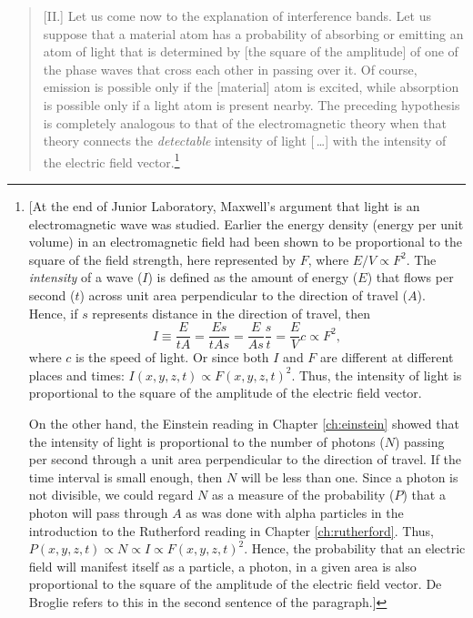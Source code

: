 \begin{quotation}
{[}II.{]} Let us come now to the explanation of interference bands. Let
us suppose that a material atom has a probability of absorbing or
emitting an atom of light that is determined by {[}the square of the
amplitude{]} of one of the phase waves that cross each other in passing
over it. Of course, emission is possible only if the {[}material{]} atom
is excited, while absorption is possible only if a light atom is present
nearby. The preceding hypothesis is completely analogous to that of the
electromagnetic theory when that theory connects the \emph{detectable}
intensity of light [\,\ldots] with the intensity of the electric field
vector.\footnote{\label{noteDeBroglie}[At the end of Junior Laboratory, Maxwell's argument
  that light is an electromagnetic wave was studied. Earlier the energy
  density (energy per unit volume) in an electromagnetic field had been
  shown to be proportional to the square of the field strength, here
  represented by $F$, where $E/V \propto F^2$. The
  \emph{intensity} of a wave ($I$) is defined as the amount of
  energy ($E$) that flows per second ($t$) across unit area
  perpendicular to the direction of travel ($A$). Hence, if
  $s$ represents distance in the direction of travel, then
  \begin{equation*}
  I \equiv \frac{E}{tA} = \frac{Es}{tAs} = \frac{E}{As}\frac{s}{t} =
    \frac{E}{V}c \propto F^2 ,
  \end{equation*}
  where $c$ is the speed of light. Or since both $I$ and
  $F$ are different at different places and times:
  $I(x,y,z,t) \propto F(x,y,z,t)^2$. Thus, the
  intensity of light is proportional to the square of the amplitude of
  the electric field vector.

  On the other hand, the Einstein reading in Chapter \ref{ch:einstein} showed that the
  intensity of light is proportional to the number of photons ($N$)
  passing per second through a unit area perpendicular to the direction
  of travel. If the time interval is small enough, then $N$ will be
  less than one. Since a photon is not divisible, we could regard
  $N$ as a measure of the probability ($P$) that a photon will
  pass through $A$ as was done with alpha particles in the
  introduction to the Rutherford reading in Chapter \ref{ch:rutherford}.
  Thus, $P(x,y,z,t) \propto N \propto I \propto
  F(x,y,z,t)^2$. Hence, the probability that an
  electric field will manifest itself as a particle, a photon, in a
  given area is also proportional to the square of the amplitude of the
  electric field vector. De Broglie refers to this in the second
  sentence of the paragraph.]}


\end{quotation}
